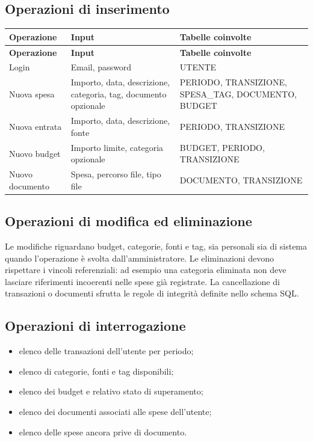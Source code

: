 \documentclass[11pt,a4paper]{article}
\begin{document}
\subsection{Operazioni di inserimento}
\begin{longtable}{p{3cm} p{5cm} p{6.5cm}}
\toprule
\textbf{Operazione} & \textbf{Input} & \textbf{Tabelle coinvolte} \\
\midrule
\endfirsthead
\toprule
\textbf{Operazione} & \textbf{Input} & \textbf{Tabelle coinvolte} \\
\midrule
\endhead
Login & Email, password & \textsc{UTENTE} \\
Nuova spesa & Importo, data, descrizione, categoria, tag, documento opzionale & \textsc{PERIODO}, \textsc{TRANSIZIONE}, \textsc{SPESA\_TAG}, \textsc{DOCUMENTO}, \textsc{BUDGET} \\
Nuova entrata & Importo, data, descrizione, fonte & \textsc{PERIODO}, \textsc{TRANSIZIONE} \\
Nuovo budget & Importo limite, categoria opzionale & \textsc{BUDGET}, \textsc{PERIODO}, \textsc{TRANSIZIONE} \\
Nuovo documento & Spesa, percorso file, tipo file & \textsc{DOCUMENTO}, \textsc{TRANSIZIONE} \\
\bottomrule
\end{longtable}

\subsection{Operazioni di modifica ed eliminazione}
Le modifiche riguardano budget, categorie, fonti e tag, sia personali sia di sistema quando l'operazione è svolta dall'amministratore. Le eliminazioni devono rispettare i vincoli referenziali: ad esempio una categoria eliminata non deve lasciare riferimenti incoerenti nelle spese già registrate. La cancellazione di transazioni o documenti sfrutta le regole di integrità definite nello schema SQL.

\subsection{Operazioni di interrogazione}
\begin{itemize}
    \item elenco delle transazioni dell'utente per periodo;
    \item elenco di categorie, fonti e tag disponibili;
    \item elenco dei budget e relativo stato di superamento;
    \item elenco dei documenti associati alle spese dell'utente;
    \item elenco delle spese ancora prive di documento.
\end{itemize}
\end{document}
